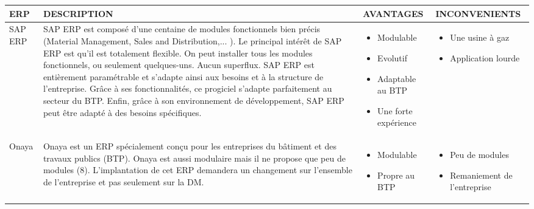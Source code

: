 \begin{center}
\begin{tabular}{|p{1cm}|p{7cm}|p{3.3cm}|p{3.3cm}|}
\hline
ERP & DESCRIPTION & AVANTAGES & INCONVENIENTS\\ \hline

SAP ERP &
SAP ERP est composé d'une centaine de modules fonctionnels bien précis (Material Management, Sales and Distribution,... ).
Le principal intérêt de SAP ERP est qu'il est totalement flexible. On peut installer tous les modules fonctionnels, ou seulement quelques-uns.
Aucun superflux. SAP ERP est entièrement paramétrable et s'adapte ainsi aux besoins et à la structure de l'entreprise.
Grâce à ses fonctionnalités, ce progiciel s'adapte parfaitement au secteur du BTP.
Enfin, grâce à son environnement de développement, SAP ERP peut être adapté à des besoins spécifiques. &
\begin{itemize}
  \item Modulable
  \item Evolutif
  \item Adaptable au BTP
  \item Une forte expérience
 \end{itemize} &
  \begin{itemize}
  \item Une usine à gaz
  \item Application lourde
 \end{itemize}\\ \hline
 
 
Onaya &
Onaya est un ERP spécialement conçu pour les entreprises du bâtiment et des travaux publics (BTP).
Onaya est aussi modulaire mais il ne propose que peu de modules (8).
L'implantation de cet ERP demandera un changement sur l'ensemble de l'entreprise et pas seulement sur la DM. &
\begin{itemize}
  \item Modulable
  \item Propre au BTP
 \end{itemize} &
  \begin{itemize}
  \item Peu de modules
  \item Remaniement de l'entreprise
 \end{itemize}\\ \hline
 

\end{tabular}
\end{center}
